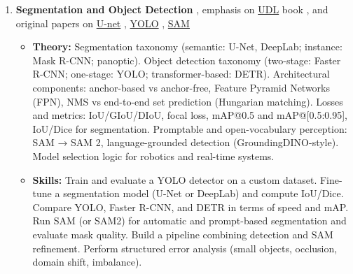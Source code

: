 \documentclass[a4paper,11pt]{texMemo}
\begin{document}
\begin{enumerate}
\item \textbf{Segmentation and Object Detection}
\citep{prince2023understanding, ronneberger2015unet, 
ren2015faster, redmon2016yolo, carion2020detr, 
lin2017focal, rezatofighi2019giou,
he2017mask, kirillov2023segment, sam2_2024, groundingdino2023}, emphasis on \href{https://udlbook.github.io/udlbook/}{UDL} book \citep{prince2023understanding}, and original papers on \href{https://arxiv.org/abs/1505.04597}{U-net} \citep{ronneberger2015unet}, \href{https://arxiv.org/abs/1506.02640}{YOLO} \citep{redmon2016yolo}, \href{https://arxiv.org/abs/2304.02643}{SAM} \citep{kirillov2023segment}
\begin{itemize}

    \item \textbf{Theory:}
    Segmentation taxonomy (semantic: U-Net, DeepLab; instance: Mask R-CNN; panoptic). 
    Object detection taxonomy (two-stage: Faster R-CNN; one-stage: YOLO; transformer-based: DETR). 
    Architectural components: anchor-based vs anchor-free, Feature Pyramid Networks (FPN), NMS vs end-to-end set prediction (Hungarian matching). 
    Losses and metrics: IoU/GIoU/DIoU, focal loss, mAP@0.5 and mAP@[0.5:0.95], IoU/Dice for segmentation. 
    Promptable and open-vocabulary perception: SAM → SAM 2, language-grounded detection (GroundingDINO-style). 
    Model selection logic for robotics and real-time systems.

    \item \textbf{Skills:}
    Train and evaluate a YOLO detector on a custom dataset. 
    Fine-tune a segmentation model (U-Net or DeepLab) and compute IoU/Dice. 
    Compare YOLO, Faster R-CNN, and DETR in terms of speed and mAP. Run SAM (or SAM2) for automatic and prompt-based segmentation and evaluate mask quality. Build a pipeline combining detection and SAM refinement. Perform structured error analysis (small objects, occlusion, domain shift, imbalance).
\end{itemize}


\end{enumerate}
\end{document}
